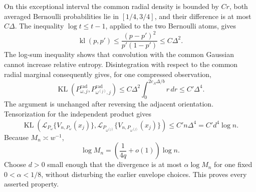 On this exceptional interval the common radial density is bounded by \(Cr\), both averaged Bernoulli probabilities lie in \([1/4,3/4]\), and their difference is at most \(C\Delta\).  The inequality \(\log t\leq t-1\), applied to the two Bernoulli atoms, gives
\[
 \operatorname{kl}(p,p')
 \leq\frac{(p-p')^2}{p'(1-p')}
 \leq C\Delta^2.
\]
The log-sum inequality shows that convolution with the common Gaussian cannot increase relative entropy.  Disintegration with respect to the common radial marginal consequently gives, for one compressed observation,
\[
 \operatorname{KL}(P^{\mathrm{rad}}_{\omega,j},P^{\mathrm{rad}}_{\omega^{(j)},j})
 \leq C\Delta^2\int_0^{2c_A\Delta/b}r\,dr
 \leq C'\Delta^4.
\]
The argument is unchanged after reversing the adjacent orientation.  Tensorization for the independent product gives
\[
 \operatorname{KL}\!\left(
 \mathcal L_{P_\omega}\{V_{n,P_\omega}(x_j)\},
 \mathcal L_{P_{\omega^{(j)}}}\{V_{n,P_{\omega^{(j)}}}(x_j)\}
 \right)
 \leq C'n\Delta^4=C'd^4\log n.
\]
Because \(M_n\asymp w^{-1}\),
\[
 \log M_n=\left(\frac{1}{4q}+o(1)\right)\log n.
\]
Choose \(d>0\) small enough that the divergence is at most \(\alpha\log M_n\) for one fixed \(0<\alpha<1/8\), without disturbing the earlier envelope choices.  This proves every asserted property.